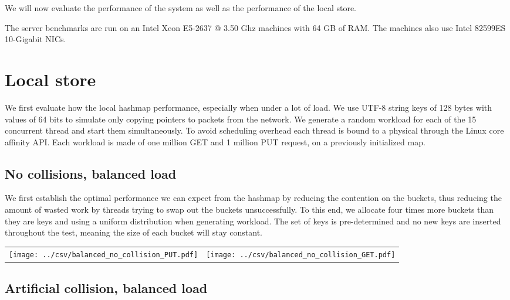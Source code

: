 \label{chap:evaluation}

We will now evaluate the performance of the system as well as the
performance of the local store.

The server benchmarks are run on an Intel Xeon E5-2637 @ 3.50 Ghz
machines with 64 GB of RAM\@. The machines also use Intel 82599ES
10-Gigabit NICs.

\section{Local store}
\label{sec:eval-local}

We first evaluate how the local hashmap performance, especially when
under a lot of load. We use UTF-8 string keys of 128 bytes with values
of 64 bits to simulate only copying pointers to packets from the
network. We generate a random workload for each of the 15 concurrent
thread and start them simultaneously. To avoid scheduling overhead
each thread is bound to a physical through the Linux core affinity
API\@. Each workload is made of one million GET and 1 million PUT
request, on a previously initialized map.

\subsection{No collisions, balanced load}

We first establish the optimal performance we can expect from the
hashmap by reducing the contention on the buckets, thus reducing the
amount of wasted work by threads trying to swap out the buckets
unsuccessfully. To this end, we allocate four times more buckets than
they are keys and using a uniform distribution when generating
workload. The set of keys is pre-determined and no new keys are
inserted throughout the test, meaning the size of each bucket will
stay constant.

\begin{center}
  \begin{tabular}{c c} \label{table:nocol-balanced}
    \texttt{[image: ../csv/balanced\_no\_collision\_PUT.pdf]}
    &
      \texttt{[image: ../csv/balanced\_no\_collision\_GET.pdf]}
  \end{tabular}
\end{center}

\subsection{Artificial collision, balanced load}

